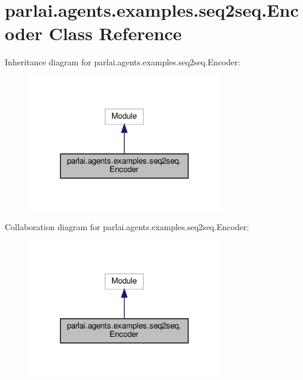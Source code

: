 \hypertarget{classparlai_1_1agents_1_1examples_1_1seq2seq_1_1Encoder}{}\section{parlai.\+agents.\+examples.\+seq2seq.\+Encoder Class Reference}
\label{classparlai_1_1agents_1_1examples_1_1seq2seq_1_1Encoder}


Inheritance diagram for parlai.\+agents.\+examples.\+seq2seq.\+Encoder\+:
\nopagebreak
\begin{figure}[H]
\begin{center}
\leavevmode
\includegraphics[width=240pt]{d1/d2c/classparlai_1_1agents_1_1examples_1_1seq2seq_1_1Encoder__inherit__graph}
\end{center}
\end{figure}


Collaboration diagram for parlai.\+agents.\+examples.\+seq2seq.\+Encoder\+:
\nopagebreak
\begin{figure}[H]
\begin{center}
\leavevmode
\includegraphics[width=240pt]{d4/d39/classparlai_1_1agents_1_1examples_1_1seq2seq_1_1Encoder__coll__graph}
\end{center}
\end{figure}
